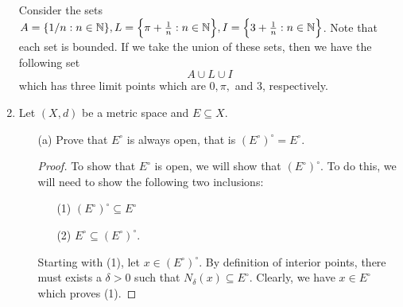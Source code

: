 \documentclass[a4paper]{article}
\begin{document}
\begin{enumerate}
\begin{solution}
                Consider the sets \(A =  \{ 1/n : n \in \mathbb{N}  \}, L =  \Big\{ \pi + \frac{ 1 }{ n } : n \in \mathbb{N}    \Big\} , I =  \Big\{ 3 + \frac{ 1 }{ n } : n \in \mathbb{N} \Big\}   \).  Note that each set is bounded. If we take the union of these sets, then we have the following set
                \[  A \cup L \cup I   \]
                which has three limit points which are \( 0, \pi,  \) and \( 3  \), respectively.
            \end{solution}
        \item Let \( (X,d)  \) be a metric space and \( E \subseteq X  \).
            \begin{enumerate}
                \item[(a)] Prove that \( E^{\circ} \) is always open, that is \( (E^{\circ})^{\circ} = E^{\circ} \).
                    \begin{proof}
                    To show that \( E^{\circ} \) is open, we will show that \( (E^{\circ})^{\circ} \). To do this, we will need to show the following two inclusions:
                    \begin{enumerate}
                        \item[(1)] \( (E^{\circ})^{\circ} \subseteq E^{\circ} \)
                        \item[(2)] \( E^{\circ} \subseteq (E^{\circ})^{\circ} \).
                    \end{enumerate}
                    Starting with (1), let \( x \in (E^{\circ})^{\circ} \). By definition of interior points, there must exists a \( \delta > 0  \) such that \( {N}_{\delta}(x) \subseteq  E^{\circ} \). Clearly, we have \( x \in E^{\circ} \) which proves (1).   


\end{proof}
\end{enumerate}
\end{enumerate}
\end{document}
